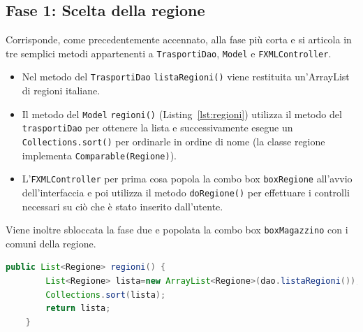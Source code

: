 \documentclass[a4paper,12pt]{report}
\begin{document}
\subsection{Fase 1: Scelta della regione}
Corrisponde, come precedentemente accennato, alla fase più corta e si articola in tre semplici metodi
appartenenti a \texttt{TrasportiDao}, \texttt{Model} e \texttt{FXMLController}.
\begin{itemize}
	\item Nel metodo del \texttt{TrasportiDao} \texttt{listaRegioni()} viene restituita un'ArrayList di regioni italiane.
	\item Il metodo del \texttt{Model} \texttt{regioni()} (Listing~\ref{lst:regioni}) utilizza il metodo del \texttt{trasportiDao} per ottenere la lista e successivamente
esegue un \texttt{Collections.sort()} per ordinarle in ordine di nome (la classe regione implementa \texttt{Comparable(Regione)}).
	\item L'\texttt{FXMLController} per prima cosa popola la combo box \texttt{boxRegione} all'avvio dell'interfaccia
e poi utilizza il metodo \texttt{doRegione()} per effettuare i controlli necessari su ciò che è stato inserito
dall'utente.
\end{itemize}
Viene inoltre sbloccata la fase due e popolata la combo box \texttt{boxMagazzino} con i comuni della regione.
\begin{center}
\begin{lstlisting}[caption={Metodo di inserimento regione del Model},  label={lst:regioni},captionpos=b, language=Java]
	public List<Regione> regioni() {
		List<Regione> lista=new ArrayList<Regione>(dao.listaRegioni());
		Collections.sort(lista);
		return lista;
	}
\end{lstlisting}
\end{center}
\end{document}
